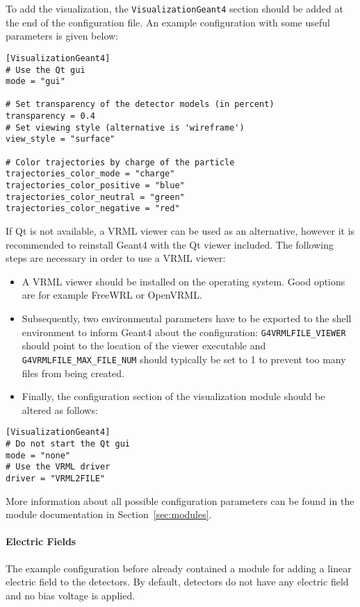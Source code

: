 To add the visualization, the \texttt{VisualizationGeant4} section should be added at the end of the configuration file.
An example configuration with some useful parameters is given below:
\begin{verbatim}
[VisualizationGeant4]
# Use the Qt gui
mode = "gui"

# Set transparency of the detector models (in percent)
transparency = 0.4
# Set viewing style (alternative is 'wireframe')
view_style = "surface"

# Color trajectories by charge of the particle
trajectories_color_mode = "charge"
trajectories_color_positive = "blue"
trajectories_color_neutral = "green"
trajectories_color_negative = "red"
\end{verbatim}
If Qt is not available, a VRML viewer can be used as an alternative, however it is recommended to reinstall Geant4 with the Qt viewer included.
The following steps are necessary in order to use a VRML viewer:
\begin{itemize}
\item A VRML viewer should be installed on the operating system.
Good options are for example FreeWRL or OpenVRML.
\item Subsequently, two environmental parameters have to be exported to the shell environment to inform Geant4 about the configuration:
\texttt{G4VRMLFILE\_VIEWER} should point to the location of the viewer executable and \texttt{G4VRMLFILE\_MAX\_FILE\_NUM} should typically be set to 1 to prevent too many files from being created.
\item Finally, the configuration section of the visualization module should be altered as follows:
\end{itemize}

\begin{verbatim}
[VisualizationGeant4]
# Do not start the Qt gui
mode = "none"
# Use the VRML driver
driver = "VRML2FILE"
\end{verbatim}

More information about all possible configuration parameters can be found in the module documentation in Section~\ref{sec:modules}.

\paragraph{Electric Fields}
\label{sec:module_electric_field}
The example configuration before already contained a module for adding a linear electric field to the detectors.
By default, detectors do not have any electric field and no bias voltage is applied.

